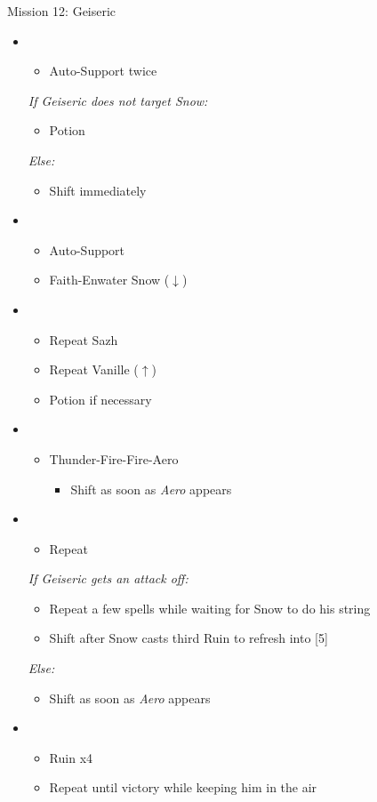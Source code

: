 \begin{battle}{Mission 12: Geiseric}
	\begin{itemize}
		\item \first
			\begin{itemize}
				\item Auto-Support twice
			\end{itemize}
			\textit{If Geiseric does not target Snow:}
			\begin{itemize}
				\item Potion
			\end{itemize}
			\textit{Else:}
			\begin{itemize}
				\item Shift immediately
			\end{itemize}
		\item \third
			\begin{itemize}
				\item Auto-Support
				\item Faith-Enwater Snow ($\downarrow$)
			\end{itemize}
		\item \fourth
			\begin{itemize}
				\item Repeat Sazh
				\item Repeat Vanille ($\uparrow$)
				\item Potion if necessary
			\end{itemize}
		\item \second
			\begin{itemize}
				\item Thunder-Fire-Fire-Aero
					\begin{itemize}
						\item Shift as soon as \textit{Aero} appears
					\end{itemize}
			\end{itemize}
		\item \sixth
			\begin{itemize}
				\item Repeat
			\end{itemize}
			\textit{If Geiseric gets an attack off:}
			\begin{itemize}
				\item Repeat a few spells while waiting for Snow to do his string
				\item Shift after Snow casts third Ruin to refresh into [5]
			\end{itemize}
			\textit{Else:}
			\begin{itemize}
				\item Shift as soon as \textit{Aero} appears
			\end{itemize}
		\item \fifth
			\begin{itemize}
				\item Ruin x4
				\item Repeat until victory while keeping him in the air
			\end{itemize}
	\end{itemize}
\end{battle}

